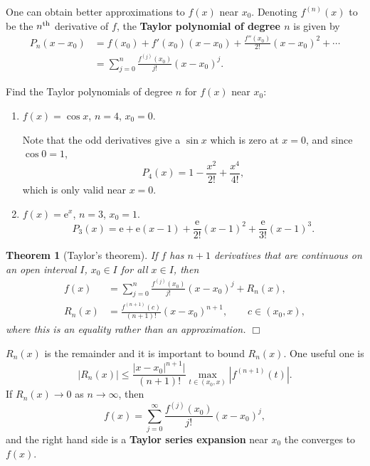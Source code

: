 \documentclass[letter-paper]{tufte-book}
\newtheorem{theorem}{\color{pastel-blue}Theorem}[section]
\newenvironment{example}[1][Example]{\begin{trivlist}
\item[\hskip \labelsep {\bfseries #1}]}{\end{trivlist}}
\newcommand{\ex}{\mathrm{e}}
\newcommand\Def[1]{\textbf{#1}}
\newcommand{\qedwhite}{\hfill \ensuremath{\Box}}
\begin{document}
One can obtain better approximations to $f(x)$ near $x_0$. Denoting $f^{(n)}(x)$
to be the $n^{\textnormal{th}}$ derivative of $f$, the \Def{Taylor
polynomial of degree $n$} is given by
\begin{align*}
  P_n(x-x_0) &= f(x_0)+f'(x_0)(x-x_0)+\frac{f''(x_0)}{2!}(x-x_0)^2+\cdots \\
    &= \sum_{j=0}^n\frac{f^{(j)}(x_0)}{j!}(x-x_0)^j.
\end{align*}

\begin{example}
  Find the Taylor polynomials of degree $n$ for $f(x)$ near $x_0$:
  \begin{enumerate}
    \item $f(x)=\cos x$, $n=4$, $x_0=0$.
    
    Note that the odd derivatives give a $\sin x$ which is zero at $x=0$, and
    since $\cos 0=1$,
    \begin{equation*}
      P_4(x)=1-\frac{x^2}{2!}+\frac{x^4}{4!},
    \end{equation*}
    which is only valid near $x=0$.
    
    \item $f(x)=\ex^x$, $n=3$, $x_0=1$.
    \begin{equation*}
      P_3(x)=\ex+\ex(x-1)+\frac{\ex}{2!}(x-1)^2+\frac{\ex}{3!}(x-1)^3.
    \end{equation*}
  \end{enumerate}
\end{example}

\begin{theorem}[Taylor's theorem]
  If $f$ has $n+1$ derivatives that are continuous on an open interval $I$,
  $x_0\in I$ for all $x\in I$, then
  \begin{align*}
    f(x) &= \sum_{j=0}^n\frac{f^{(j)}(x_0)}{j!}(x-x_0)^j + R_n(x), \\
    R_n(x) &= \frac{f^{(n+1)}(c)}{(n+1)!}(x-x_0)^{n+1},\qquad c\in(x_0, x),
  \end{align*}
  where this is an equality rather than an approximation. \qedwhite
\end{theorem}
$R_n(x)$ is the remainder and it is important to bound $R_n(x)$. One useful one
is
\begin{equation*}
  |R_n(x)|\leq \frac{|x-x_0|^{n+1}|}{(n+1)!}
  \max_{t\in(x_0,x)}\left|f^{(n+1)}(t)\right|.
\end{equation*}
If $R_n(x)\to 0$ as $n\to\infty$, then
\begin{equation*}
  f(x)=\sum_{j=0}^\infty\frac{f^{(j)}(x_0)}{j!}(x-x_0)^j,
\end{equation*}
and the right hand side is a \Def{Taylor series expansion} near $x_0$ the
converges to $f(x)$.
\end{document}
